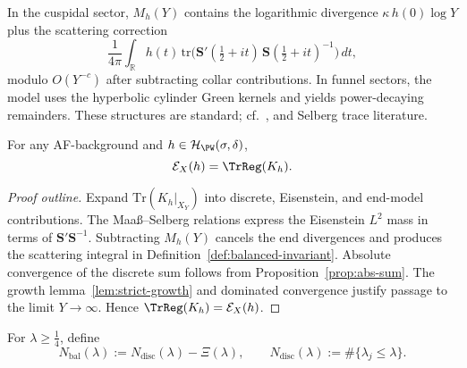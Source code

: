 \begin{remark}\label{rem:model-term}
In the cuspidal sector, $M_h(Y)$ contains the logarithmic divergence
$\kappa\,h(0)\log Y$ plus the scattering correction
\[
\frac{1}{4\pi}\int_{\mathbb{R}}h(t)\,
\mathrm{tr}\Big(\mathbf{S}'(\tfrac12+it)\,\mathbf{S}(\tfrac12+it)^{-1}\Big)\,dt,
\]
modulo $O(Y^{-c})$ after subtracting collar contributions. In funnel
sectors, the model uses the hyperbolic cylinder Green kernels and yields
power-decaying remainders. These structures are standard; cf.\
\cite{GuillopeZworski}, \cite{Borthwick} and Selberg trace literature.     %
\end{remark}


\begin{theorem}[Spectral sum = regularized kernel trace]\label{thm:E-equals-trace}
For any AF-background and $h\in\mathcal{H}_{\PW}(\sigma,\delta)$,
\[
\mathcal{E}_X(h)=\TrReg(K_h).
\]
\end{theorem}

\begin{proof}[Proof outline]
Expand $\mathrm{Tr}(K_h|_{X_Y})$ into discrete, Eisenstein, and end-model
contributions. The Maaß–Selberg relations express the Eisenstein $L^2$
mass in terms of $\mathbf{S}'\mathbf{S}^{-1}$. Subtracting $M_h(Y)$
cancels the end divergences and produces the scattering integral in
Definition~\ref{def:balanced-invariant}. Absolute convergence of the
discrete sum follows from Proposition~\ref{prop:abs-sum}. The growth
lemma~\ref{lem:strict-growth} and dominated convergence justify passage
to the limit $Y\to\infty$. Hence $\TrReg(K_h)=\mathcal{E}_X(h)$.          %
\end{proof}


\begin{definition}\label{def:balanced-count}
For $\lambda\ge \tfrac14$, define
\[
N_{\mathrm{bal}}(\lambda):=N_{\mathrm{disc}}(\lambda)-\Xi(\lambda),\qquad
N_{\mathrm{disc}}(\lambda):=\#\{\lambda_j\le \lambda\}.
\]
\end{definition}

